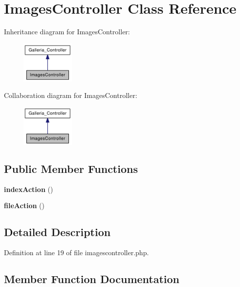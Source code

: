 \section{ImagesController Class Reference}
\label{classImagesController}
Inheritance diagram for ImagesController:\nopagebreak
\begin{figure}[H]
\begin{center}
\leavevmode
\includegraphics[width=74pt]{classImagesController__inherit__graph}
\end{center}
\end{figure}
Collaboration diagram for ImagesController:\nopagebreak
\begin{figure}[H]
\begin{center}
\leavevmode
\includegraphics[width=74pt]{classImagesController__coll__graph}
\end{center}
\end{figure}
\subsection*{Public Member Functions}
\begin{CompactItemize}
\item 
{\bf indexAction} ()
\item 
{\bf fileAction} ()
\end{CompactItemize}


\subsection{Detailed Description}


Definition at line 19 of file imagescontroller.php.

\subsection{Member Function Documentation}
